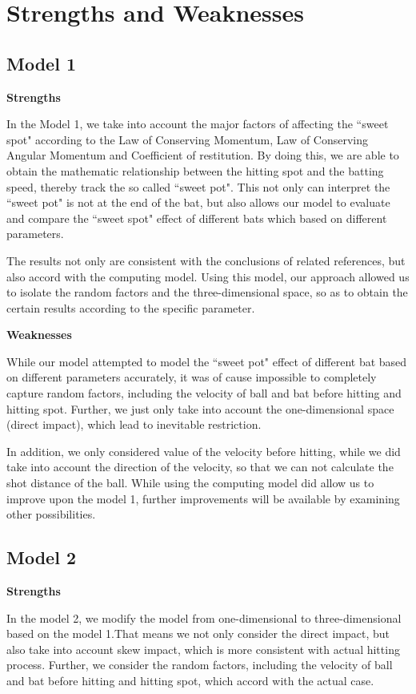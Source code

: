 \section{Strengths and Weaknesses}

\subsection{Model 1}

\textbf{Strengths}

In the Model 1, we take into account the major factors of affecting the ``sweet spot" according to the Law of Conserving Momentum, Law of Conserving Angular Momentum and Coefficient of restitution. By doing this, we are able to obtain the mathematic relationship between the hitting spot and the batting speed, thereby track the so called ``sweet pot". This not only can interpret the ``sweet pot" is not at the end of the bat, but also allows our model to evaluate and compare the ``sweet spot" effect of different bats which based on different parameters.

The results not only are consistent with the conclusions of related references, but also accord with the computing model. Using this model, our approach allowed us to isolate the random factors and the three-dimensional space, so as to obtain the certain results according to the specific parameter.


\textbf{Weaknesses}

While our model attempted to model the ``sweet pot" effect of different bat based on different parameters accurately, it was of cause impossible to completely capture random factors, including the velocity of ball and bat before hitting and hitting spot. Further, we just only take into account the one-dimensional space (direct impact), which lead to inevitable restriction.

In addition, we only considered value of the velocity before hitting, while we did take into account the direction of the velocity, so that we can not calculate the shot distance of the ball. While using the computing model did allow us to improve upon the model 1, further improvements will be available by examining other possibilities.

\subsection{Model 2}

\textbf{Strengths}

In the model 2, we modify the model from one-dimensional to three-dimensional based on the model 1.That means we not only consider the direct impact, but also take into account skew impact, which is more consistent with actual hitting process. Further, we consider the random factors, including the velocity of ball and bat before hitting and hitting spot, which accord with the actual case.

